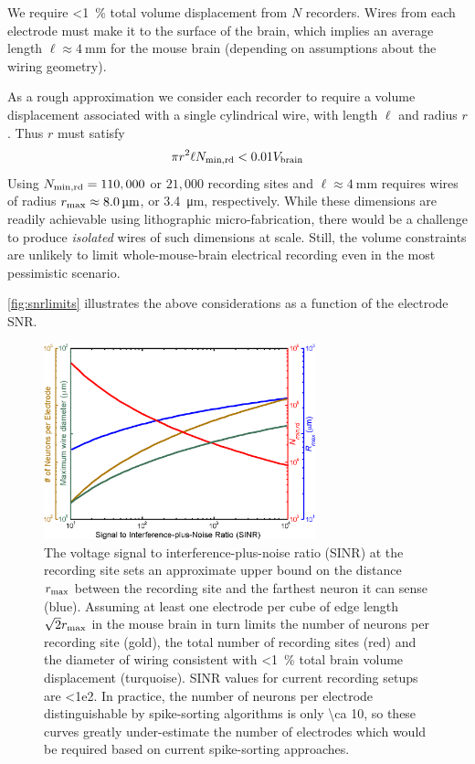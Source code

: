 We require \SI{<1}{\percent} total volume displacement from $N$ recorders.
Wires from each electrode must make it to the surface of the brain, which implies an average length $\ell\approx\SI{4}{\milli\meter}$ for the mouse brain (depending on assumptions about the wiring geometry).

As a rough approximation we consider each recorder to require a volume displacement associated with a single cylindrical wire, with length $\ell$ and radius $r$.
Thus $r$ must satisfy \[\pi r^2\ell N_{\text{\scriptsize min,rd}} < 0.01V_{\text{\scriptsize brain}}\]
Using $N_{\text{\scriptsize min,rd}} = 110,000$ or $21,000$ recording sites and $\ell\approx\SI{4}{\milli\meter}$ requires wires of radius $r_{\text{\scriptsize max}} \approx \SI{8.0}{\micro\meter}$, or \SI{3.4}{\micro\meter}, respectively.
While these dimensions are readily achievable using lithographic micro-fabrication, there would be a challenge to produce \emph{isolated} wires of such dimensions at scale.
Still, the volume constraints are unlikely to limit whole-mouse-brain electrical recording even in the most pessimistic scenario.

\autoref{fig:snrlimits} illustrates the above considerations as a function of the electrode SNR.

\begin{figure}[htbp]
\caption{
The voltage signal to interference-plus-noise ratio (SINR) at the recording site sets an approximate upper bound on the distance $r_{\text{\scriptsize max}}$ between the recording site and the farthest neuron it can sense (blue).
Assuming at least one electrode per cube of edge length $\sqrt{2}r_{\text{\scriptsize max}}$ in the mouse brain in turn limits the number of neurons per recording site (gold), the total number of recording sites (red) and the diameter of wiring consistent with \SI{<1}{\percent} total brain volume displacement (turquoise).
SINR values for current recording setups are \num{<1e2}.
In practice, the number of neurons per electrode distinguishable by spike-sorting algorithms is only \num{\ca 10}, so these curves greatly under-estimate the number of electrodes which would be required based on current spike-sorting approaches.
}
\label{fig:snrlimits}
\centering
\includegraphics[width=0.7\textwidth]{figs/Fig3.eps}
\end{figure}

